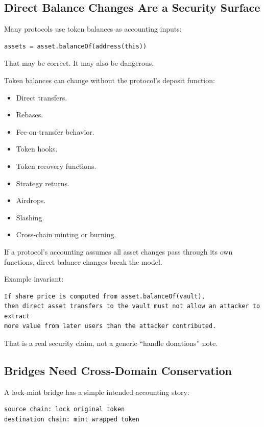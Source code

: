 \subsection{Direct Balance Changes Are a Security Surface}

Many protocols use token balances as accounting inputs:

\begin{lstlisting}
assets = asset.balanceOf(address(this))
\end{lstlisting}

That may be correct. It may also be dangerous.

Token balances can change without the protocol's deposit function:

\begin{itemize}
\tightlist
\item
  Direct transfers.
\item
  Rebases.
\item
  Fee-on-transfer behavior.
\item
  Token hooks.
\item
  Token recovery functions.
\item
  Strategy returns.
\item
  Airdrops.
\item
  Slashing.
\item
  Cross-chain minting or burning.
\end{itemize}

If a protocol's accounting assumes all asset changes pass through its
own functions, direct balance changes break the model.

Example invariant:

\begin{lstlisting}
If share price is computed from asset.balanceOf(vault),
then direct asset transfers to the vault must not allow an attacker to extract
more value from later users than the attacker contributed.
\end{lstlisting}

That is a real security claim, not a generic ``handle donations'' note.

\subsection{Bridges Need Cross-Domain Conservation}

A lock-mint bridge has a simple intended accounting story:

\begin{lstlisting}
source chain: lock original token
destination chain: mint wrapped token
\end{lstlisting}


